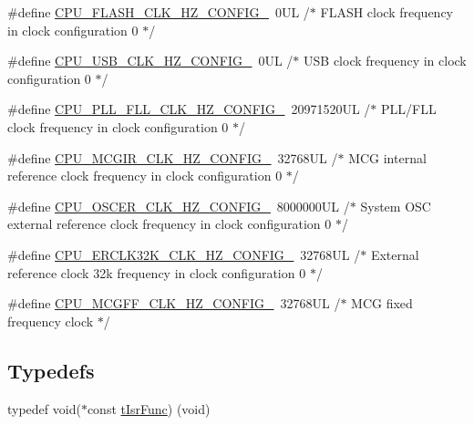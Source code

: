 \begin{DoxyCompactItemize}
\item 
\#define \hyperlink{group___cpu__module_ga09c9820f38d931a0400b832d2582c6f7}{C\+P\+U\+\_\+\+F\+L\+A\+S\+H\+\_\+\+C\+L\+K\+\_\+\+H\+Z\+\_\+\+C\+O\+N\+F\+I\+G\+\_}~0\+U\+L /$\ast$ F\+L\+A\+S\+H clock frequency in clock configuration 0 $\ast$/
\item 
\#define \hyperlink{group___cpu__module_ga7bf843fdf59af5fcaf48bea898884a3e}{C\+P\+U\+\_\+\+U\+S\+B\+\_\+\+C\+L\+K\+\_\+\+H\+Z\+\_\+\+C\+O\+N\+F\+I\+G\+\_}~0\+U\+L /$\ast$ U\+S\+B clock frequency in clock configuration 0 $\ast$/
\item 
\#define \hyperlink{group___cpu__module_gad2aaa2918b640ae3833fc84e8f983c3c}{C\+P\+U\+\_\+\+P\+L\+L\+\_\+\+F\+L\+L\+\_\+\+C\+L\+K\+\_\+\+H\+Z\+\_\+\+C\+O\+N\+F\+I\+G\+\_}~20971520\+U\+L /$\ast$ P\+L\+L/\+F\+L\+L clock frequency in clock configuration 0 $\ast$/
\item 
\#define \hyperlink{group___cpu__module_ga860e7441eac7d5e35385bcd62b019d9d}{C\+P\+U\+\_\+\+M\+C\+G\+I\+R\+\_\+\+C\+L\+K\+\_\+\+H\+Z\+\_\+\+C\+O\+N\+F\+I\+G\+\_}~32768\+U\+L /$\ast$ M\+C\+G internal reference clock frequency in clock configuration 0 $\ast$/
\item 
\#define \hyperlink{group___cpu__module_ga2960ebfe6475f475999ea8f1d5448483}{C\+P\+U\+\_\+\+O\+S\+C\+E\+R\+\_\+\+C\+L\+K\+\_\+\+H\+Z\+\_\+\+C\+O\+N\+F\+I\+G\+\_}~8000000\+U\+L /$\ast$ System O\+S\+C external reference clock frequency in clock configuration 0 $\ast$/
\item 
\#define \hyperlink{group___cpu__module_ga092702a75fd1041eb311850abb022240}{C\+P\+U\+\_\+\+E\+R\+C\+L\+K32\+K\+\_\+\+C\+L\+K\+\_\+\+H\+Z\+\_\+\+C\+O\+N\+F\+I\+G\+\_}~32768\+U\+L /$\ast$ External reference clock 32k frequency in clock configuration 0 $\ast$/
\item 
\#define \hyperlink{group___cpu__module_gafd8ec2ac4ea47574f95d0e5a6f80807e}{C\+P\+U\+\_\+\+M\+C\+G\+F\+F\+\_\+\+C\+L\+K\+\_\+\+H\+Z\+\_\+\+C\+O\+N\+F\+I\+G\+\_}~32768\+U\+L /$\ast$ M\+C\+G fixed frequency clock $\ast$/
\end{DoxyCompactItemize}
\subsection*{Typedefs}
\begin{DoxyCompactItemize}
\item 
typedef void($\ast$const \hyperlink{group___cpu__module_gafea04d3e8135767c03ce099f02e97437}{t\+Isr\+Func}) (void)
\end{DoxyCompactItemize}
